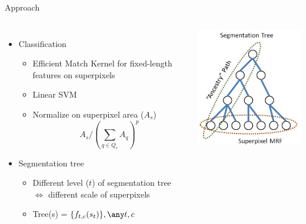 \documentclass[12pt]{beamer}
\begin{document}
\begin{frame}{Approach}
	\begin{columns}[l]
			\begin{itemize}
			\item Classification
			\begin{itemize}
				\item Efficient Match Kernel for fixed-length features on superpixels
				\item Linear SVM
				\item Normalize on superpixel area ($A_s$)
				\[A_s / (\sum_{q\in Q_c}A_q)^p\]
			\end{itemize}
			\item Segmentation tree
				\begin{itemize}
					\item Different level ($t$) of segmentation tree $\Leftrightarrow$ different scale of superpixels \\
					\item Tree(s) = $\{f_{t, c}(s_t)\}, \any t, c$
				\end{itemize}
			\end{itemize}
			\includegraphics[width=\textwidth]{fig2.png}
	\end{columns}
\end{frame}
\end{document}
